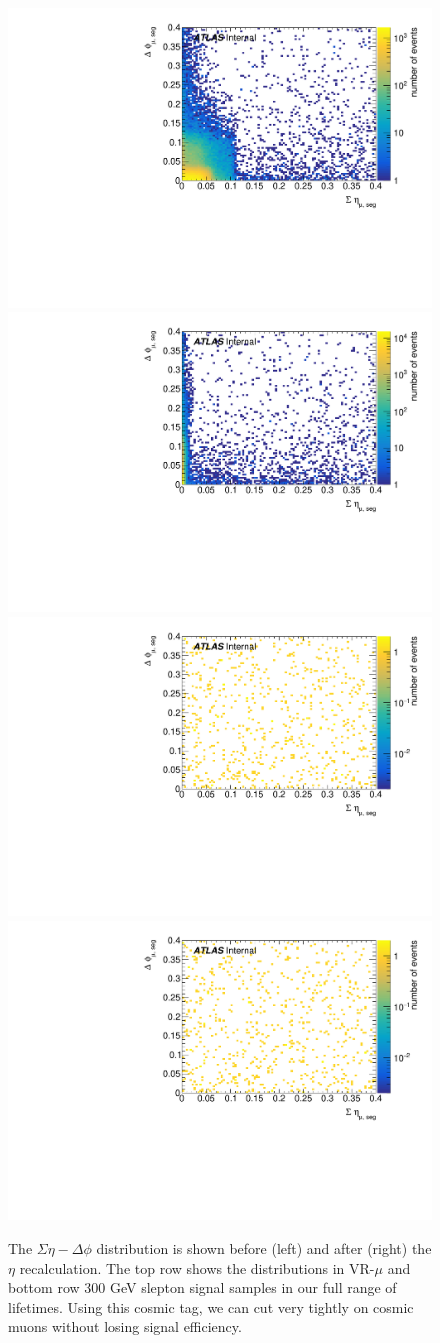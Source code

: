 \begin{figure}[!ht]
\centering
\includegraphics[width=.48\textwidth]{figures/cosmics/v4_widetag_2_sumEta_dPhi_min.pdf}
\includegraphics[width=.48\textwidth]{figures/cosmics/v4_widetag_2_sumEta_dPhi_min_corr.pdf}
\includegraphics[width=.48\textwidth]{figures/cosmics/300_slep_2_sumEta_dPhi_min.pdf}
\includegraphics[width=.48\textwidth]{figures/cosmics/300_slep_2_sumEta_dPhi_min_corr.pdf}
\caption{The $\Sigma\eta - \Delta\phi$ distribution is shown before (left) and after (right) the $\eta$ recalculation. The top row shows the distributions in VR-$\mu$ and bottom row 300 GeV slepton signal samples in our full range of lifetimes. Using this cosmic tag, we can cut very tightly on cosmic muons without losing signal efficiency.}
\label{fig:cos_eta_phi}
\end{figure}


